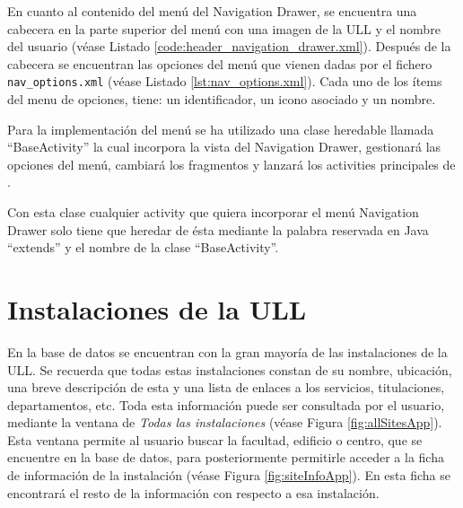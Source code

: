 

En cuanto al contenido del menú del Navigation Drawer, se encuentra una cabecera en la parte superior del menú con una imagen de la ULL y el nombre del usuario (véase Listado \ref{code:header_navigation_drawer.xml}). Después de la cabecera se encuentran las opciones del menú que vienen dadas por el fichero \texttt{nav\_options.xml} (véase Listado \ref{lst:nav_options.xml}). Cada uno de los ítems del menu de opciones, tiene: un identificador, un icono asociado y un nombre.


   
\bigskip



Para la implementación del menú se ha utilizado una clase heredable llamada ``BaseActivity'' la cual incorpora la vista del Navigation Drawer, gestionará las opciones del menú, cambiará los fragmentos y lanzará los activities principales de \ULLAR{}. 



Con esta clase cualquier activity que quiera incorporar el menú Navigation Drawer  solo tiene que heredar de ésta mediante la palabra reservada en Java ``extends'' y el nombre de la clase ``BaseActivity''.

        
\section{Instalaciones de la ULL}

En la base de datos se encuentran con la gran mayoría de las instalaciones de la ULL. Se recuerda que todas estas instalaciones constan de su nombre, ubicación, una breve descripción de esta y una lista de enlaces a los servicios, titulaciones, departamentos, etc. Toda esta información puede ser consultada por el usuario, mediante la ventana de \textit{Todas las instalaciones} (véase Figura \ref{fig:allSitesApp}). Esta ventana permite al usuario buscar la facultad, edificio o centro, que se encuentre en la base de datos, para posteriormente permitirle acceder a la ficha de información de la instalación (véase Figura \ref{fig:siteInfoApp}). En esta ficha se encontrará el resto de la información con respecto a esa instalación.

